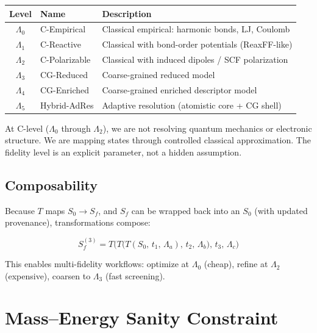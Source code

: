 \documentclass[11pt]{article}
\begin{document}
\begin{center}
\begin{tabular}{clp{7cm}}
\toprule
\textbf{Level} & \textbf{Name} & \textbf{Description} \\
\midrule
$\Lambda_0$ & C-Empirical & Classical empirical: harmonic bonds, LJ, Coulomb \\
$\Lambda_1$ & C-Reactive & Classical with bond-order potentials (ReaxFF-like) \\
$\Lambda_2$ & C-Polarizable & Classical with induced dipoles / SCF polarization \\
$\Lambda_3$ & CG-Reduced & Coarse-grained reduced model \\
$\Lambda_4$ & CG-Enriched & Coarse-grained enriched descriptor model \\
$\Lambda_5$ & Hybrid-AdRes & Adaptive resolution (atomistic core + CG shell) \\
\bottomrule
\end{tabular}
\end{center}

At C-level ($\Lambda_0$ through $\Lambda_2$), we are not resolving quantum mechanics or electronic structure. We are mapping states through controlled classical approximation. The fidelity level is an explicit parameter, not a hidden assumption.

\subsection{Composability}

Because $T$ maps $S_0 \to S_f$, and $S_f$ can be wrapped back into an $S_0$ (with updated provenance), transformations compose:

\begin{equation}
S_f^{(3)} = T\bigl(T\bigl(T(S_0, \, t_1, \, \Lambda_a), \, t_2, \, \Lambda_b\bigr), \, t_3, \, \Lambda_c\bigr)
\end{equation}

This enables multi-fidelity workflows: optimize at $\Lambda_0$ (cheap), refine at $\Lambda_2$ (expensive), coarsen to $\Lambda_3$ (fast screening).

\section{Mass--Energy Sanity Constraint}
\end{document}
